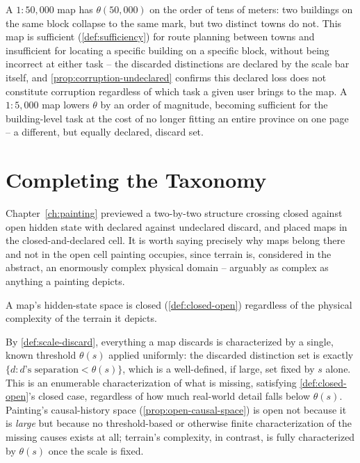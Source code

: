 \begin{example}
A $1{:}50{,}000$ map has $\theta(50{,}000)$ on the order of tens of
meters: two buildings on the same block collapse to the same mark, but
two distinct towns do not. This map is sufficient
(\cref{def:sufficiency}) for route planning between towns and
insufficient for locating a specific building on a specific block,
without being incorrect at either task -- the discarded distinctions are
declared by the scale bar itself, and \cref{prop:corruption-undeclared}
confirms this declared loss does not constitute corruption regardless of
which task a given user brings to the map. A $1{:}5{,}000$ map lowers
$\theta$ by an order of magnitude, becoming sufficient for the
building-level task at the cost of no longer fitting an entire province
on one page -- a different, but equally declared, discard set.
\end{example}

\section{Completing the Taxonomy}

Chapter~\ref{ch:painting} previewed a two-by-two structure crossing
closed against open hidden state with declared against undeclared
discard, and placed maps in the closed-and-declared cell. It is worth
saying precisely why maps belong there and not in the open cell painting
occupies, since terrain is, considered in the abstract, an enormously
complex physical domain -- arguably as complex as anything a painting
depicts.

\begin{proposition}
\label{prop:map-closedness}
A map's hidden-state space is closed (\cref{def:closed-open}) regardless
of the physical complexity of the terrain it depicts.
\end{proposition}

\begin{proofsketch}
By \cref{def:scale-discard}, everything a map discards is characterized
by a single, known threshold $\theta(s)$ applied uniformly: the discarded
distinction set is exactly $\{d : d\text{'s separation} < \theta(s)\}$,
which is a well-defined, if large, set fixed by $s$ alone. This is an
enumerable characterization of what is missing, satisfying
\cref{def:closed-open}'s closed case, regardless of how much real-world
detail falls below $\theta(s)$. Painting's causal-history space
(\cref{prop:open-causal-space}) is open not because it is \emph{large}
but because no threshold-based or otherwise finite characterization of
the missing causes exists at all; terrain's complexity, in contrast, is
fully characterized by $\theta(s)$ once the scale is fixed.
\end{proofsketch}


